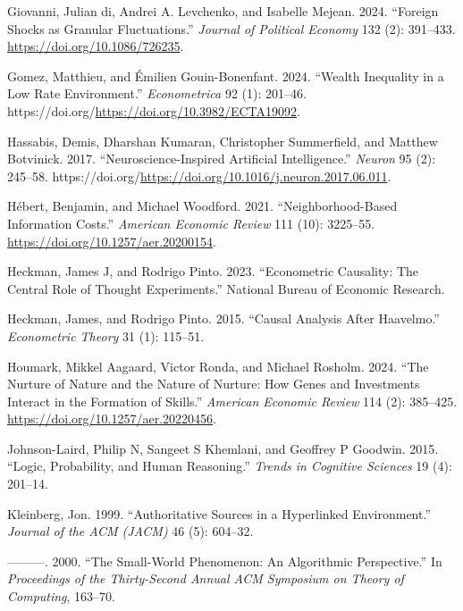 \documentclass[
]{article}
\newlength{\cslhangindent}
\newenvironment{CSLReferences}[2] %
 {\begin{list}{}{%
  \setlength{\itemindent}{0pt}
  \setlength{\leftmargin}{0pt}
  \setlength{\parsep}{0pt}
  \ifodd #1
   \setlength{\leftmargin}{\cslhangindent}
   \setlength{\itemindent}{-1\cslhangindent}
  \fi
  \setlength{\itemsep}{#2\baselineskip}}}
 {\end{list}}
\theoremstyle{plain}
\theoremstyle{definition}
\theoremstyle{remark}
\begin{document}
\begin{CSLReferences}{1}{0}
Giovanni, Julian di, Andrei A. Levchenko, and Isabelle Mejean. 2024.
{``Foreign Shocks as Granular Fluctuations.''} \emph{Journal of
Political Economy} 132 (2): 391--433.
\url{https://doi.org/10.1086/726235}.

Gomez, Matthieu, and Émilien Gouin-Bonenfant. 2024. {``Wealth Inequality
in a Low Rate Environment.''} \emph{Econometrica} 92 (1): 201--46.
https://doi.org/\url{https://doi.org/10.3982/ECTA19092}.

Hassabis, Demis, Dharshan Kumaran, Christopher Summerfield, and Matthew
Botvinick. 2017. {``Neuroscience-Inspired Artificial Intelligence.''}
\emph{Neuron} 95 (2): 245--58.
https://doi.org/\url{https://doi.org/10.1016/j.neuron.2017.06.011}.

Hébert, Benjamin, and Michael Woodford. 2021. {``Neighborhood-Based
Information Costs.''} \emph{American Economic Review} 111 (10):
3225--55. \url{https://doi.org/10.1257/aer.20200154}.

Heckman, James J, and Rodrigo Pinto. 2023. {``Econometric Causality: The
Central Role of Thought Experiments.''} National Bureau of Economic
Research.

Heckman, James, and Rodrigo Pinto. 2015. {``Causal Analysis After
Haavelmo.''} \emph{Econometric Theory} 31 (1): 115--51.

Houmark, Mikkel Aagaard, Victor Ronda, and Michael Rosholm. 2024. {``The
Nurture of Nature and the Nature of Nurture: How Genes and Investments
Interact in the Formation of Skills.''} \emph{American Economic Review}
114 (2): 385--425. \url{https://doi.org/10.1257/aer.20220456}.

Johnson-Laird, Philip N, Sangeet S Khemlani, and Geoffrey P Goodwin.
2015. {``Logic, Probability, and Human Reasoning.''} \emph{Trends in
Cognitive Sciences} 19 (4): 201--14.

Kleinberg, Jon. 1999. {``Authoritative Sources in a Hyperlinked
Environment.''} \emph{Journal of the ACM (JACM)} 46 (5): 604--32.

---------. 2000. {``The Small-World Phenomenon: An Algorithmic
Perspective.''} In \emph{Proceedings of the Thirty-Second Annual ACM
Symposium on Theory of Computing}, 163--70.


\end{CSLReferences}
\end{document}
